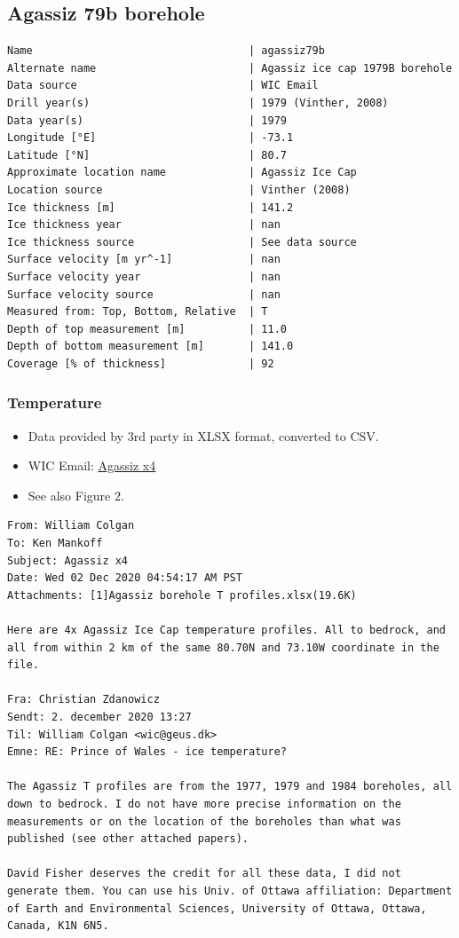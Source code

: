 \documentclass[article,a4paper,times,11pt,twoside]{article}
\begin{document}
\subsection{Agassiz 79b borehole}
\label{sec:org8f041f9}
\begin{verbatim}
Name                                  | agassiz79b
Alternate name                        | Agassiz ice cap 1979B borehole
Data source                           | WIC Email
Drill year(s)                         | 1979 (Vinther, 2008)
Data year(s)                          | 1979
Longitude [°E]                        | -73.1
Latitude [°N]                         | 80.7
Approximate location name             | Agassiz Ice Cap
Location source                       | Vinther (2008)
Ice thickness [m]                     | 141.2
Ice thickness year                    | nan
Ice thickness source                  | See data source
Surface velocity [m yr^-1]            | nan
Surface velocity year                 | nan
Surface velocity source               | nan
Measured from: Top, Bottom, Relative  | T
Depth of top measurement [m]          | 11.0
Depth of bottom measurement [m]       | 141.0
Coverage [% of thickness]             | 92
\end{verbatim}

\subsubsection{Temperature}
\label{sec:org068e2a1}

\begin{itemize}
\item Data provided by 3rd party in XLSX format, converted to CSV.
\item WIC Email: \href{msgid:AM0PR04MB6129DE88C9253A951702EE06A2F30@AM0PR04MB6129.eurprd04.prod.outlook.com}{Agassiz x4}
\item See also \textcite{clarke_1987_wind} Figure 2.
\end{itemize}

\begin{verbatim}
From: William Colgan
To: Ken Mankoff
Subject: Agassiz x4
Date: Wed 02 Dec 2020 04:54:17 AM PST
Attachments: [1]Agassiz borehole T profiles.xlsx(19.6K)

Here are 4x Agassiz Ice Cap temperature profiles. All to bedrock, and
all from within 2 km of the same 80.70N and 73.10W coordinate in the
file.

Fra: Christian Zdanowicz
Sendt: 2. december 2020 13:27
Til: William Colgan <wic@geus.dk>
Emne: RE: Prince of Wales - ice temperature?

The Agassiz T profiles are from the 1977, 1979 and 1984 boreholes, all
down to bedrock. I do not have more precise information on the
measurements or on the location of the boreholes than what was
published (see other attached papers).

David Fisher deserves the credit for all these data, I did not
generate them. You can use his Univ. of Ottawa affiliation: Department
of Earth and Environmental Sciences, University of Ottawa, Ottawa,
Canada, K1N 6N5.
\end{verbatim}
\end{document}
